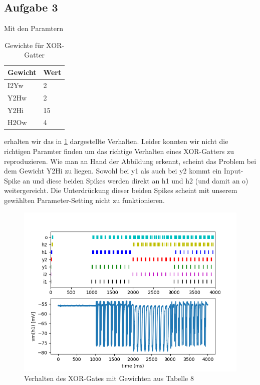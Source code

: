 \documentclass[10pt,a4paper]{scrartcl}
\begin{document}
\subsection{Aufgabe 3}
Mit den Paramtern

\begin{table}[H]
\centering
\captionsetup{justification=centering}
\caption{Gewichte für XOR-Gatter}
\begin{tabular}{l|l}
 Gewicht&Wert\\
\hline
I2Yw&2\\
Y2Hw&2\\
Y2Hi&15\\
H2Ow&4
\end{tabular}
\label{tab:08}
\end{table}

\noindent erhalten wir das in \ref{fig:abb42} dargestellte Verhalten. Leider konnten wir nicht die richtigen Paramter finden um das richtige Verhalten eines XOR-Gatters zu reproduzieren. Wie man an Hand der Abbildung erkennt, scheint das Problem bei dem Gewicht Y2Hi zu liegen. Sowohl bei y1 als auch bei y2 kommt ein Input-Spike an und diese beiden Spikes werden direkt an h1 und h2 (und damit an o) weitergereicht. Die Unterdrückung dieser beiden Spikes scheint mit unserem gewählten Parameter-Setting nicht zu funktionieren. 

\newpage

\begin{figure} [ht]
\begin{center}
\label{fig:abb42}
\caption{Verhalten des XOR-Gates mit Gewichten aus Tabelle 8}
\includegraphics[scale=0.45]{pictures/aufgabe7_3.png}
\end{center}
\end{figure}
\end{document}
